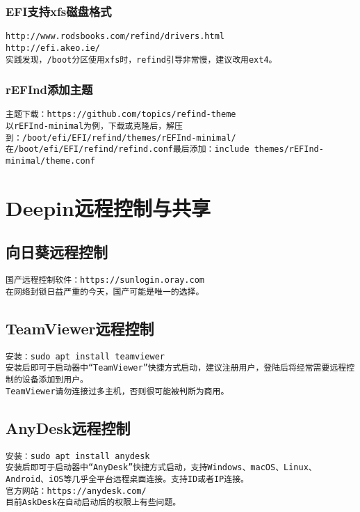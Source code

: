\documentclass[a4paper,fontset=fandol,zihao=-4,linespread=1.2,oneside]{ctexbook}
\begin{document}
\subsection{EFI支持xfs磁盘格式}
\begin{lstlisting}
http://www.rodsbooks.com/refind/drivers.html
http://efi.akeo.ie/
实践发现，/boot分区使用xfs时，refind引导非常慢，建议改用ext4。
\end{lstlisting}

\subsection{rEFInd添加主题}
\begin{lstlisting}
主题下载：https://github.com/topics/refind-theme
以rEFInd-minimal为例，下载或克隆后，解压到：/boot/efi/EFI/refind/themes/rEFInd-minimal/
在/boot/efi/EFI/refind/refind.conf最后添加：include themes/rEFInd-minimal/theme.conf
\end{lstlisting}


\chapter{Deepin远程控制与共享}

\section{向日葵远程控制}
\begin{lstlisting}
国产远程控制软件：https://sunlogin.oray.com
在网络封锁日益严重的今天，国产可能是唯一的选择。
\end{lstlisting}

\section{TeamViewer远程控制}
\begin{lstlisting}
安装：sudo apt install teamviewer
安装后即可于启动器中“TeamViewer”快捷方式启动，建议注册用户，登陆后将经常需要远程控制的设备添加到用户。
TeamViewer请勿连接过多主机，否则很可能被判断为商用。
\end{lstlisting}

\section{AnyDesk远程控制}
\begin{lstlisting}
安装：sudo apt install anydesk
安装后即可于启动器中“AnyDesk”快捷方式启动，支持Windows、macOS、Linux、Android、iOS等几乎全平台远程桌面连接。支持ID或者IP连接。
官方网站：https://anydesk.com/
目前AskDesk在自动启动后的权限上有些问题。
\end{lstlisting}
\end{document}

